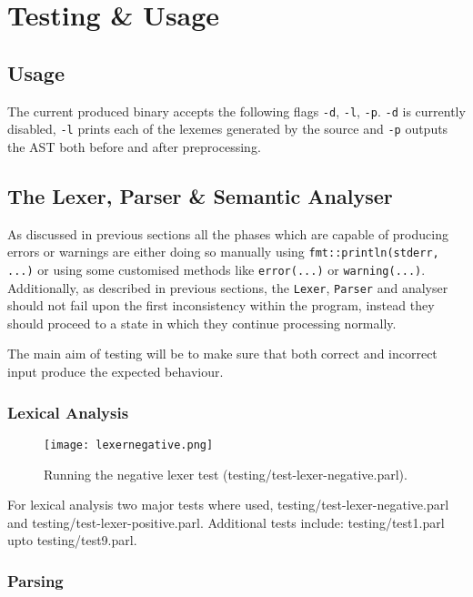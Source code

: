\section{Testing \& Usage}

\subsection{Usage}

The current produced binary accepts the following flags
\texttt{-d}, \texttt{-l}, \texttt{-p}. \texttt{-d} is currently
disabled, \texttt{-l} prints each of the lexemes generated by
the source and \texttt{-p} outputs the AST both before and after
preprocessing.

\subsection{The Lexer, Parser \& Semantic Analyser}

As discussed in previous sections all the phases which are
capable of producing errors or warnings are either doing so
manually using \texttt{fmt::println(stderr, ...)} or using some
customised methods like \texttt{error(...)} or
\texttt{warning(...)}. Additionally, as described in previous
sections, the \texttt{Lexer}, \texttt{Parser} and analyser
should not fail upon the first inconsistency within the program,
instead they should proceed to a state in which they continue
processing normally.

The main aim of testing will be to make sure that both correct
and incorrect input produce the expected behaviour.

\subsubsection{Lexical Analysis}

\begin{figure}[H]
\centering
\texttt{[image: lexernegative.png]}
\caption{Running the negative lexer test
(testing/test-lexer-negative.parl).}
\end{figure}

For lexical analysis two major tests where used,
testing/test-lexer-negative.parl and
testing/test-lexer-positive.parl. Additional tests include:
testing/test1.parl upto testing/test9.parl.

\subsubsection{Parsing}

